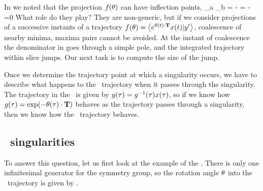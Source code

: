 {In  we noted that the projection $f({\bf \theta})$
can have inflection points,
\beq
{}
     {\partial \gSpace_a \partial \gSpace_b}
    =
  - =
  - =0
What role do they play? They are non-generic, but
if we consider projections of a successive instants of a trajectory
$f({\bf \theta})=\left\langle {e^{\ensuremath{{\bf \theta}}(t) \cdot \ensuremath{\mathbf{T}}} \ensuremath{x}(t)}|{{y'}} \right\rangle$, coalescence of
nearby minima, maxima pairs cannot be avoided. At the instant of coalescence
the denominator in  goes through a simple pole,
and the integrated trajectory within slice jumps. Our next task is
to compute the size of the jump.

Once we determine the trajectory point at which
a singularity occurs, we have to describe what happens to the \reducedsp\ trajectory when it passes through the singularity. The trajectory in the \reducedsp\ is given by $y(\tau)=g^{-1}(\tau) x(\tau)$, so if we know how $g(\tau)=\exp({-{\bf \theta}(\tau) \cdot \mathbf{T}})$ behaves as the trajectory passes through a singularity, then we know how the \reducedsp\ trajectory behaves.



\subsection{\CLe\ singularities}
\label{sect:cLeSing}

To answer this question, let us first look at the example of the \cLe. There is only one infinitesimal generator for the  symmetry group, so the rotation angle ${\bf \theta}$ into the \reducedsp\ trajectory is given by .

}
